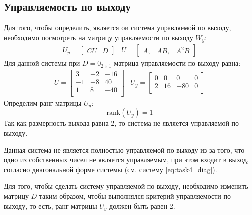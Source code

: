 \subsection{Управляемость по выходу}
Для того, чтобы определить, является ои система управляемой по выходу, необходимо посмотреть на 
матрицу управляемости по выходу $W_y$:
\begin{equation}
    \begin{array}{cc}
        U_y = \begin{bmatrix}
            CU & D
        \end{bmatrix} & 
        U = \begin{bmatrix}
            A, & AB, & A^2B
        \end{bmatrix} 
    \end{array}
\end{equation}
Для данной системы при $D = 0_{2\times 1}$ матрица управляемости по выходу равна: 
\begin{equation}
    \begin{array}{cc}
        U = \begin{bmatrix}
            3  & -2  & -16 \\ 
            -1  & -8  & 40 \\ 
            1  & 8  & -40 \\ 
        \end{bmatrix} &
        U_y = \begin{bmatrix}
            0  & 0  & 0  & 0  \\ 
            2  & 16  & -80  & 0  \\ 
        \end{bmatrix}
    \end{array}
\end{equation}
Определим ранг матрицы $U_y$:
\begin{equation}
    \text{rank}(U_y) = 1
\end{equation}
Так как размерность выхода равна 2, то система не является управляемой по выходу. 

Данная система не является полностью управляемой по выходу из-за того, что одно 
из собственных чисел не является управляемым, при этом входит в выход, согласно 
диагональной форме системы (см. систему \eqref{eq:task4_diag}).

Для того, чтобы сделать систему управляемой по выходу, необходимо изменить матрицу 
$D$ таким образом, чтобы выполнялся критерий управляемости по выходу, то есть, ранг 
матрицы $U_y$ должен быть равен 2. 


